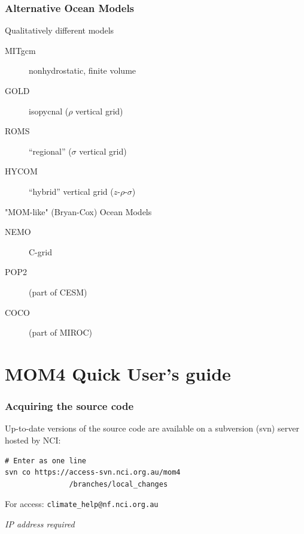 \documentclass{beamer}
\begin{document}
\begin{frame}
    \frametitle{Alternative Ocean Models}
    
    Qualitatively different models
    \begin{description}
        \item[MITgcm] nonhydrostatic, finite volume
        \item[GOLD] isopycnal ($\rho$ vertical grid)
        \item[ROMS] ``regional'' ($\sigma$ vertical grid)
        \item[HYCOM] ``hybrid'' vertical grid ($z$-$\rho$-$\sigma$)
    \end{description}
    
    "MOM-like" (Bryan-Cox) Ocean Models
    \begin{description}
        \item[NEMO] C-grid
        \item[POP2] (part of CESM)
        \item[COCO] (part of MIROC)
    \end{description}
\end{frame}

\section{MOM4 Quick User's guide}
\begin{frame}[fragile]
    \frametitle{Acquiring the source code}
    
    Up-to-date versions of the source code are available on a subversion (svn)
    server hosted by NCI:
    
    \begin{lstlisting}
# Enter as one line
svn co https://access-svn.nci.org.au/mom4
               /branches/local_changes
    \end{lstlisting}
    For access: \lstinline|climate_help@nf.nci.org.au|
    
    \textit{IP address required} 
\end{frame}
\end{document}
